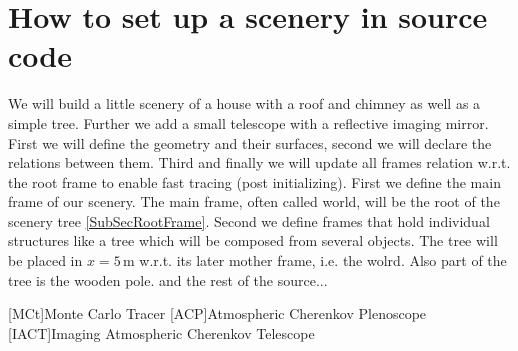 \documentclass[11pt,a4paper,oneside,titlepage]{book}
\begin{document}
\chapter{How to set up a scenery in source code}
%
We will build a little scenery of a house with a roof and chimney as well as a simple tree. Further we add a small telescope with a reflective imaging mirror.
%
First we will define the geometry and their surfaces, second we will declare the relations between them. Third and finally we will update all frames relation w.r.t. the root frame to enable fast tracing (post initializing).
% 
%
First we define the main frame of our scenery. The main frame, often called world, will be the root of the scenery tree \ref{SubSecRootFrame}. 
%
%
Second we define frames that hold individual structures like a tree which will be composed from several objects. The tree will be placed in $x=5\,$m w.r.t. its later mother frame, i.e. the wolrd. 
%
Also part of the tree is the wooden pole.
and the rest of the source...


\renewcommand{\bibname}{References}

  
\addcontentsline{toc}{chapter}{\bibname}
%
\begin{acronym}
    [MCt]{Monte Carlo Tracer}
    [ACP]{Atmospheric Cherenkov Plenoscope}
    [IACT]{Imaging Atmospheric Cherenkov Telescope}
\end{acronym}
\end{document}
